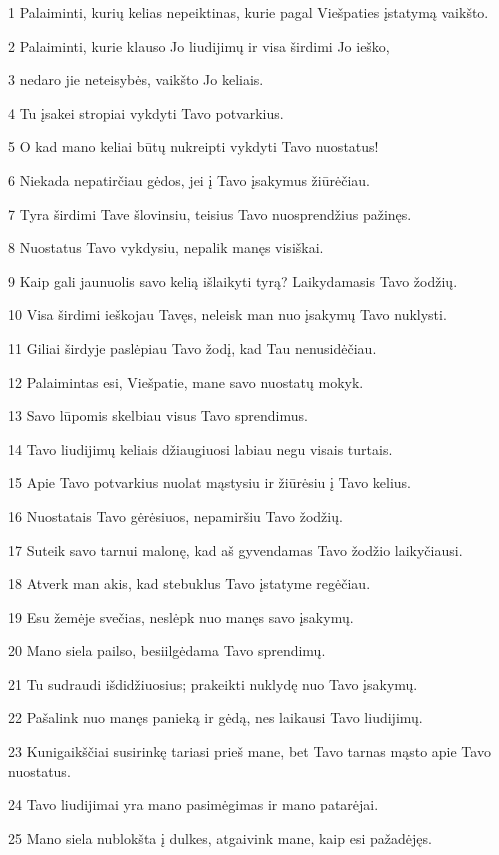 \par 1 Palaiminti, kurių kelias nepeiktinas, kurie pagal Viešpaties įstatymą vaikšto. 
\par 2 Palaiminti, kurie klauso Jo liudijimų ir visa širdimi Jo ieško, 
\par 3 nedaro jie neteisybės, vaikšto Jo keliais. 
\par 4 Tu įsakei stropiai vykdyti Tavo potvarkius. 
\par 5 O kad mano keliai būtų nukreipti vykdyti Tavo nuostatus! 
\par 6 Niekada nepatirčiau gėdos, jei į Tavo įsakymus žiūrėčiau. 
\par 7 Tyra širdimi Tave šlovinsiu, teisius Tavo nuosprendžius pažinęs. 
\par 8 Nuostatus Tavo vykdysiu, nepalik manęs visiškai. 
\par 9 Kaip gali jaunuolis savo kelią išlaikyti tyrą? Laikydamasis Tavo žodžių. 
\par 10 Visa širdimi ieškojau Tavęs, neleisk man nuo įsakymų Tavo nuklysti. 
\par 11 Giliai širdyje paslėpiau Tavo žodį, kad Tau nenusidėčiau. 
\par 12 Palaimintas esi, Viešpatie, mane savo nuostatų mokyk. 
\par 13 Savo lūpomis skelbiau visus Tavo sprendimus. 
\par 14 Tavo liudijimų keliais džiaugiuosi labiau negu visais turtais. 
\par 15 Apie Tavo potvarkius nuolat mąstysiu ir žiūrėsiu į Tavo kelius. 
\par 16 Nuostatais Tavo gėrėsiuos, nepamiršiu Tavo žodžių. 
\par 17 Suteik savo tarnui malonę, kad aš gyvendamas Tavo žodžio laikyčiausi. 
\par 18 Atverk man akis, kad stebuklus Tavo įstatyme regėčiau. 
\par 19 Esu žemėje svečias, neslėpk nuo manęs savo įsakymų. 
\par 20 Mano siela pailso, besiilgėdama Tavo sprendimų. 
\par 21 Tu sudraudi išdidžiuosius; prakeikti nuklydę nuo Tavo įsakymų. 
\par 22 Pašalink nuo manęs panieką ir gėdą, nes laikausi Tavo liudijimų. 
\par 23 Kunigaikščiai susirinkę tariasi prieš mane, bet Tavo tarnas mąsto apie Tavo nuostatus. 
\par 24 Tavo liudijimai yra mano pasimėgimas ir mano patarėjai. 
\par 25 Mano siela nublokšta į dulkes, atgaivink mane, kaip esi pažadėjęs. 
